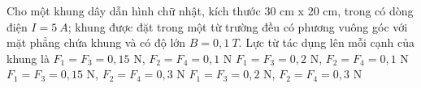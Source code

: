 \begin{vidu} %
Cho một khung dây dẫn hình chữ nhật, kích thước 30 cm x 20 cm, trong có dòng điện $I = 5\ A$; khung được đặt trong một từ trường đều có phương vuông góc với mặt phẳng chứa khung và có độ lớn $B = 0,1\ T$. Lực từ tác dụng lên mỗi cạnh của khung là
\choice
{\True $F_1 = F_3 = 0,15$ N, $F_2 = F_4 = 0,1$ N}
{$F_1 = F_3 = 0,2$ N, $F_2 = F_4 = 0,1$ N}
{$F_1 = F_3 = 0,15$ N, $F_2 = F_4 = 0,3$ N}
{$F_1 = F_3 = 0,2$ N, $F_2 = F_4 = 0,3$ N}
\end{vidu}
